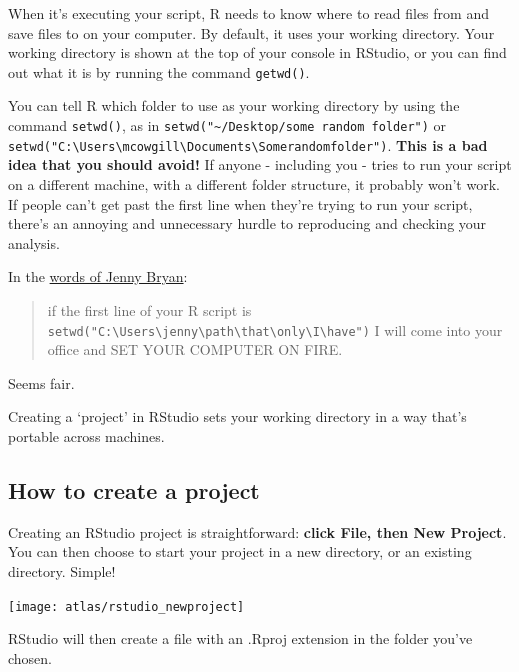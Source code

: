 \documentclass[
]{book}
\begin{document}
When it's executing your script, R needs to know where to read files from and save files to on your computer. By default, it uses your working directory. Your working directory is shown at the top of your console in RStudio, or you can find out what it is by running the command \texttt{getwd()}.

You can tell R which folder to use as your working directory by using the command \texttt{setwd()}, as in \texttt{setwd("\textasciitilde{}/Desktop/some\ random\ folder")} or \texttt{setwd("C:\textbackslash{}Users\textbackslash{}mcowgill\textbackslash{}Documents\textbackslash{}Somerandomfolder")}. \textbf{This is a bad idea that you should avoid!} If anyone - including you - tries to run your script on a different machine, with a different folder structure, it probably won't work. If people can't get past the first line when they're trying to run your script, there's an annoying and unnecessary hurdle to reproducing and checking your analysis.

In the \href{https://www.tidyverse.org/articles/2017/12/workflow-vs-script/}{words of Jenny Bryan}:

\begin{quote}
if the first line of your R script is \texttt{setwd("C:\textbackslash{}Users\textbackslash{}jenny\textbackslash{}path\textbackslash{}that\textbackslash{}only\textbackslash{}I\textbackslash{}have")} I will come into your office and SET YOUR COMPUTER ON FIRE.
\end{quote}

Seems fair.

Creating a `project' in RStudio sets your working directory in a way that's portable across machines.

\hypertarget{how-to-create-a-project}{%
\subsection{How to create a project}\label{how-to-create-a-project}}

Creating an RStudio project is straightforward: \textbf{click File, then New Project}. You can then choose to start your project in a new directory, or an existing directory. Simple!

\begin{center}\texttt{[image: atlas/rstudio\_newproject]} \end{center}

RStudio will then create a file with an .Rproj extension in the folder you've chosen.
\end{document}
